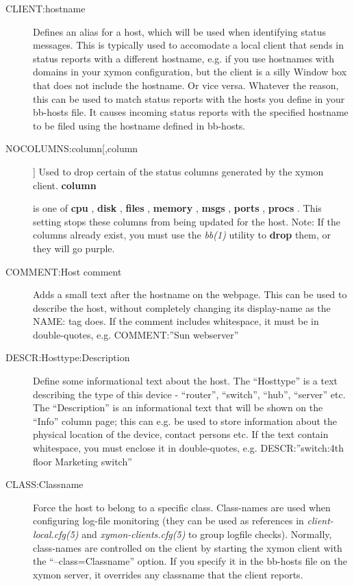 \begin{description}
 

\item[CLIENT:hostname] Defines an alias for a host, which will be used
  when identifying status messages. This is typically used to
  accomodate a local client that sends in status reports with a
  different hostname, e.g. if you use hostnames with domains in your
  xymon configuration, but the client is a silly Window box that does
  not include the hostname. Or vice versa. Whatever the reason, this
  can be used to match status reports with the hosts you define in
  your bb-hosts file. It causes incoming status reports with the
  specified hostname to be filed using the hostname defined in
  bb-hosts. 


 

\item[NOCOLUMNS:column[,column]] Used to drop certain of the status
  columns generated by the xymon client. \textbf{column}

 is one of \textbf{cpu}
, \textbf{disk}
, \textbf{files}
, \textbf{memory}
, \textbf{msgs}
, \textbf{ports}
, \textbf{procs}
. This setting stops these columns from being updated for the
 host. Note: If the columns already exist, you must use the
 \emph{bb(1)} utility to \textbf{drop} them, or they will go purple. 


 

\item[COMMENT:Host comment] Adds a small text after the hostname on
  the webpage. This can be used to describe the host, without
  completely changing its display-name as the NAME: tag does. If the
  comment includes whitespace, it must be in double-quotes,
  e.g. COMMENT:''Sun webserver'' 


 

\item[DESCR:Hosttype:Description] Define some informational text about
  the host. The ``Hosttype'' is a text describing the type of this
  device - ``router'', ``switch'', ``hub'', ``server'' etc. The
  ``Description'' is an informational text that will be shown on the
  ``Info'' column page; this can e.g. be used to store information
  about the physical location of the device, contact persons etc. If
  the text contain whitespace, you must enclose it in double-quotes,
  e.g. DESCR:''switch:4th floor Marketing switch'' 


 \item[CLASS:Classname] Force the host to belong to a specific
  class. Class-names are used when configuring log-file monitoring
  (they can be used as references in \emph{client-local.cfg(5)} and
  \emph{xymon-clients.cfg(5)} to group logfile checks). Normally,
  class-names are controlled on the client by starting the xymon
  client with the ``--class=Classname'' option. If you specify it in
  the bb-hosts file on the xymon server, it overrides any classname
  that the client reports. 



\end{description}
